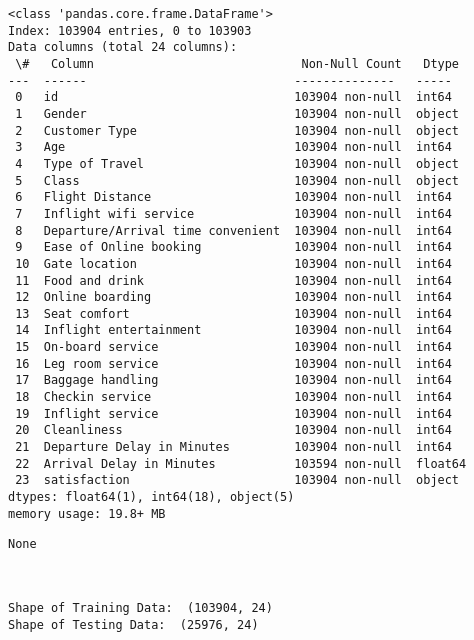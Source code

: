 \documentclass[11pt]{article}
\makeatletter
\newcommand{\boxspacing}{\kern\kvtcb@left@rule\kern\kvtcb@boxsep}
\newcommand{\prompt}[4]{
        {\ttfamily\llap{{\color{#2}[#3]:\hspace{3pt}#4}}\vspace{-\baselineskip}}
    }
\makeatother
\begin{document}
    \begin{Verbatim}[commandchars=\\\{\}]
<class 'pandas.core.frame.DataFrame'>
Index: 103904 entries, 0 to 103903
Data columns (total 24 columns):
 \#   Column                             Non-Null Count   Dtype
---  ------                             --------------   -----
 0   id                                 103904 non-null  int64
 1   Gender                             103904 non-null  object
 2   Customer Type                      103904 non-null  object
 3   Age                                103904 non-null  int64
 4   Type of Travel                     103904 non-null  object
 5   Class                              103904 non-null  object
 6   Flight Distance                    103904 non-null  int64
 7   Inflight wifi service              103904 non-null  int64
 8   Departure/Arrival time convenient  103904 non-null  int64
 9   Ease of Online booking             103904 non-null  int64
 10  Gate location                      103904 non-null  int64
 11  Food and drink                     103904 non-null  int64
 12  Online boarding                    103904 non-null  int64
 13  Seat comfort                       103904 non-null  int64
 14  Inflight entertainment             103904 non-null  int64
 15  On-board service                   103904 non-null  int64
 16  Leg room service                   103904 non-null  int64
 17  Baggage handling                   103904 non-null  int64
 18  Checkin service                    103904 non-null  int64
 19  Inflight service                   103904 non-null  int64
 20  Cleanliness                        103904 non-null  int64
 21  Departure Delay in Minutes         103904 non-null  int64
 22  Arrival Delay in Minutes           103594 non-null  float64
 23  satisfaction                       103904 non-null  object
dtypes: float64(1), int64(18), object(5)
memory usage: 19.8+ MB
    \end{Verbatim}

            \begin{tcolorbox}[breakable, size=fbox, boxrule=.5pt, pad at break*=1mm, opacityfill=0]
\prompt{Out}{outcolor}{7}{\boxspacing}
\begin{Verbatim}[commandchars=\\\{\}]
None
\end{Verbatim}
\end{tcolorbox}
        
    \begin{Verbatim}[commandchars=\\\{\}]


Shape of Training Data:  (103904, 24)
Shape of Testing Data:  (25976, 24)
    \end{Verbatim}
\end{document}
